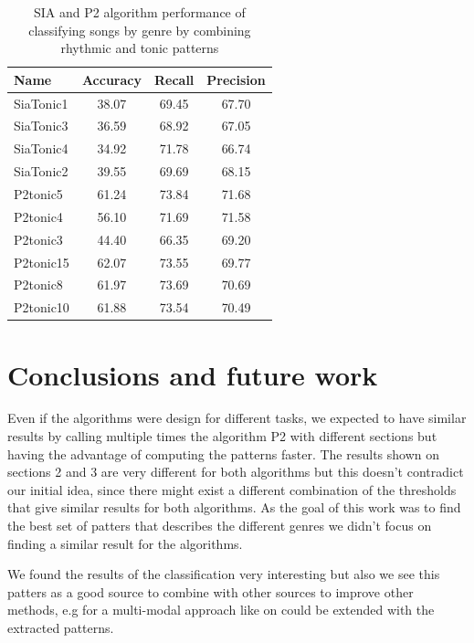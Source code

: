 \documentclass{article}
\begin{document}
\begin{table}
 \begin{center}
 \begin{tabular}{|l|c|c|c|}
  \hline
  Name & Accuracy & Recall& Precision \\
  \hline
  SiaTonic1 & 38.07 & 69.45 & 67.70 \\
  \hline
  SiaTonic3 & 36.59 & 68.92 & 67.05 \\
  \hline
  SiaTonic4 & 34.92 & 71.78 & 66.74 \\
  \hline
  SiaTonic2 & 39.55 & 69.69 & 68.15 \\
  \hline
  P2tonic5 & 61.24 & 73.84 & 71.68 \\
  \hline
  P2tonic4 & 56.10 & 71.69 & 71.58  \\
  \hline
  P2tonic3 & 44.40 & 66.35 & 69.20  \\
  \hline
  P2tonic15 & 62.07 & 73.55 & 69.77  \\
  \hline
  P2tonic8 & 61.97 & 73.69 & 70.69 \\
  \hline
  P2tonic10 & 61.88 & 73.54 & 70.49 \\
  \hline
 \end{tabular}
\end{center}
 \caption{SIA and P2 algorithm performance of classifying songs by genre by combining rhythmic and tonic patterns}
 \label{tonic_rhythm_results}
\end{table}

\section{Conclusions and future work}

Even if the algorithms were design for different tasks, we expected to have similar results by calling multiple times the algorithm P2 with different sections but having the advantage of computing the patterns faster. The results shown on sections 2 and 3 are very different for both algorithms but this doesn't contradict our initial idea, since there might exist a different combination of the thresholds that give similar results for both algorithms. As the goal of this work was to find the best set of patters that describes the different genres we didn't focus on finding a similar result for the algorithms.

We found the results of the classification very interesting but also we see this patters as a good source to combine with other sources to improve other methods, e.g for a multi-modal approach like on \cite{oramas2017multi} could be extended with the extracted patterns. 
\end{document}
